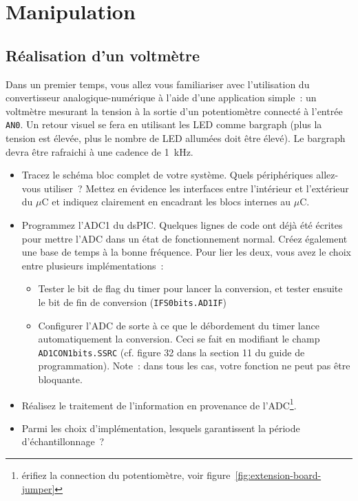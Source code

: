 \documentclass[11pt,a4paper]{article}
\theoremstyle{definition}%
\begin{document}
\section{Manipulation}

\subsection{Réalisation d'un voltmètre}
Dans un premier temps, vous allez vous familiariser avec l’utilisation du convertisseur analogique-numérique à l’aide d’une application simple~: un voltmètre mesurant la tension à la sortie d’un potentiomètre connecté à l’entrée \texttt{AN0}.
Un retour visuel se fera en utilisant les LED comme bargraph (plus la tension est élevée, plus le nombre de LED allumées doit être élevé).
Le bargraph devra être rafraichi à une cadence de 1~kHz.
\begin{itemize}
	\item Tracez le schéma bloc complet de votre système.
	Quels périphériques allez-vous utiliser~?
	Mettez en évidence les interfaces entre l’intérieur et l’extérieur du $\mu$C et indiquez clairement en encadrant les blocs internes au $\mu$C.
	\item Programmez l’ADC1 du dsPIC. Quelques lignes de code ont déjà été écrites pour mettre l’ADC dans un état de fonctionnement normal.
	Créez également une base de temps à la bonne fréquence. Pour lier les deux, vous avez le choix entre plusieurs implémentations~:
	\begin{itemize}
		\item Tester le bit de flag du timer pour lancer la conversion, et tester ensuite le bit de fin de conversion (\texttt{IFS0bits.AD1IF})
		\item Configurer l’ADC de sorte à ce que le débordement du timer lance automatiquement la conversion.
		Ceci se fait en modifiant le champ \texttt{AD1CON1bits.SSRC} (cf. figure 32 dans la section 11 du guide de programmation).
		Note~: dans tous les cas, votre fonction ne peut pas être bloquante.
	\end{itemize}
	\item Réalisez le traitement de l’information en provenance de l’ADC\footnote{érifiez la connection du potentiomètre, voir figure~\ref{fig:extension-board-jumper}}.
	\item Parmi les choix d’implémentation, lesquels garantissent la période d’échantillonnage~?
\end{itemize}
\end{document}

